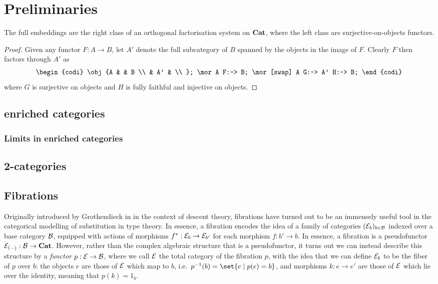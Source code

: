 \documentclass[../thesis.tex]{subfiles}
\begin{document}
  \chapter{Preliminaries}

  
  \begin{lemma}
    The full embeddings are the right class of an orthogonal factorisation system on ${\mathbf{Cat}}$, where
    the left class are surjective-on-objects functors.
  \end{lemma}
  \begin{proof}
    Given any functor $F : A \to B$, let $A'$ denote the full subcategory of $B$ spanned by the
    objects in the image of $F$. Clearly $F$ then factors through $A'$ as
    \[\begin{codi}
      \obj {A & & B \\
            & A' & \\ };
      \mor A F:-> B;
      \mor[swap] A G:-> A' H:-> B;
    \end{codi}\]
    where $G$ is surjective on objects and $H$ is fully faithful and injective on objects.
  \end{proof}


  \section{enriched categories}
  \label{sec:enriched}

  \subsection{Limits in enriched categories}
  \label{sec:enriched/limits}
  
  \section{2-categories}
  \label{sec:2-cats}

  \section{Fibrations}
  Originally introduced by Grothendieck in \cite{grothendieck1960} in the context of descent theory, fibrations
  have turned out to be an immensely useful tool in the categorical modelling of substitution in type theory.
  In essence, a fibration encodes the idea of a family of categories $({\mathcal{E}}_b)_{b \in {\mathcal{B}}}$ indexed over a base
  category ${\mathcal{B}}$, equipped with actions of morphisms $f^* : {\mathcal{E}}_b \to {\mathcal{E}}_{b'}$ for each morphism $f : b' \to
  b$. In essence, a fibration is a pseudofunctor ${\mathcal{E}}_{(-)} : {\mathcal{B}} \to {\mathbf{Cat}}$. However, rather than the complex
  algebraic structure that is a pseudofunctor, it turns out we can instead describe this structure by
  a \emph{functor} $p : {\mathcal{E}} \to {\mathcal{B}}$, where we call ${\mathcal{E}}$ the total category of the fibration $p$, with
  the idea that we can define ${\mathcal{E}}_{b}$ to be the fiber of $p$ over $b$: the objects $e$ are those of ${\mathcal{E}}$
  which map to $b$, i.e.\ $p^{-1}(b) = \set{e \given p(e) = b}$, and morphisms $k : e \to e'$ are those of
  ${\mathcal{E}}$ which lie over the identity, meaning that $p(k) = 1_b$.
\end{document}
